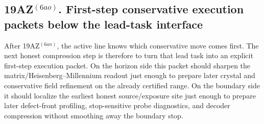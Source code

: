 \subsection*{19AZ$^{(6ao)}$. First-step conservative execution packets below the lead-task interface}
\label{sec:first-step-conservative-execution-packets-below-the-lead-task-interface}
After 19AZ$^{(6an)}$, the active line knows which conservative move comes first. The next honest compression step is therefore to turn that lead task into an explicit first-step execution packet. On the horizon side this packet should sharpen the matrix/Heisenberg--Millennium readout just enough to prepare later crystal and conservative field refinement on the already certified range. On the boundary side it should localize the earliest honest source/exposure site just enough to prepare later defect-front profiling, stop-sensitive probe diagnostics, and decoder compression without smoothing away the boundary stop.

